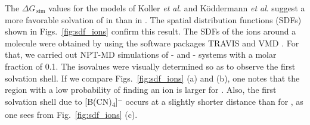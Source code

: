 \documentclass[3p,twocolumn]{elsarticle}
\begin{document}
The $\Delta G_{\, \text{sim}}$ values for the models of Koller \textit{et al}. \cite{Koller_2012} and K\"{o}ddermann \textit{et al}. \cite{K_ddermann_2007} suggest a more favorable solvation of  in \ce{[emim][B(CN)_4]} than in \ce{[emim][NTf_2]}. 
The spatial distribution functions (SDFs) \cite{Svishchev_1993} shown in Figs.~\ref{fig:sdf_ions} confirm this result.
The SDFs of the ions around a  molecule were obtained by using the software packages TRAVIS \cite{Brehm_2011} and VMD \cite{HUMP96}.
For that, we carried out NPT-MD simulations of -\ce{[emim][B(CN)_4]} and -\ce{[emim][NTf_2]} systems with a  molar fraction of 0.1.
The isovalues were visually determined so as to observe the first solvation shell.
If we compare Figs.~\ref{fig:sdf_ions} (a) and (b), one notes that the region with a low probability of finding an ion is larger for \ce{[emim][NTf_2]}.
Also, the first solvation shell due to [B(CN)\textsubscript{4}]$^{-}$ occurs at a slightly shorter distance than for \ce{[NTf_2]^-}, as one sees from Fig.~\ref{fig:sdf_ions} (c).
\end{document}
